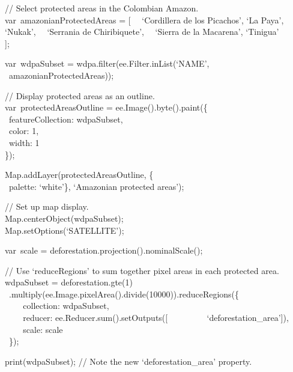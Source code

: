 \documentclass[
  letterpaper,
  DIV=11,
  numbers=noendperiod]{scrreprt}
\begin{document}
// Select protected areas in the Colombian Amazon.\\
var~amazonianProtectedAreas = {[}~ ~`Cordillera de los Picachos', `La
Paya', `Nukak',~ ~`Serrania de Chiribiquete',~ ~`Sierra de la Macarena',
`Tinigua'\\
{]};

var~wdpaSubset = wdpa.filter(ee.Filter.inList(`NAME',\\
\hspace*{0.333em} ~amazonianProtectedAreas));

// Display protected areas as an outline.\\
var~protectedAreasOutline = ee.Image().byte().paint(\{\\
\hspace*{0.333em} ~featureCollection: wdpaSubset,\\
\hspace*{0.333em} ~color: 1,\\
\hspace*{0.333em} ~width: 1\\
\});

Map.addLayer(protectedAreasOutline, \{\\
\hspace*{0.333em} ~palette: `white'\}, `Amazonian protected areas');

// Set up map display.\\
Map.centerObject(wdpaSubset);\\
Map.setOptions(`SATELLITE');

var~scale = deforestation.projection().nominalScale();

// Use `reduceRegions' to sum together pixel areas in each protected
area.\\
wdpaSubset = deforestation.gte(1)\\
\hspace*{0.333em}
~.multiply(ee.Image.pixelArea().divide(10000)).reduceRegions(\{\\
\hspace*{0.333em} ~ ~ ~collection: wdpaSubset,\\
\hspace*{0.333em} ~ ~ ~reducer: ee.Reducer.sum().setOutputs({[}~ ~ ~ ~ ~
~`deforestation\_area'{]}),\\
\hspace*{0.333em} ~ ~ ~scale: scale\\
\hspace*{0.333em} ~\});

print(wdpaSubset); // Note the new `deforestation\_area' property.
\end{document}
